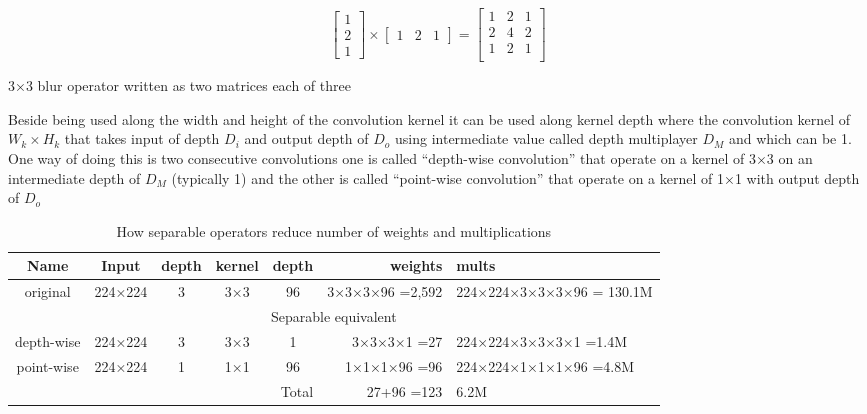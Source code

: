 \begin{eqfloat}
\begin{equation}
\begin{bmatrix}
1 \\
2 \\
1
\end{bmatrix}
\times
\begin{bmatrix}
1 & 2 & 1
\end{bmatrix}
=\begin{bmatrix}
1 & 2 & 1 \\
2 & 4 & 2 \\
1 & 2 & 1 \\
\end{bmatrix}
\label{eq:sep_blur}
\end{equation}
\caption{ 3×3 blur operator written as two matrices each of three }
\end{eqfloat}

Beside being used along the width and height of the convolution kernel it can be used along kernel depth
where the convolution kernel of \( W_k \times H_k \) that takes input of depth \(D_i\)
and output depth of \(D_o\) using intermediate value called depth multiplayer \(D_M\) and which can be 1.
One way of doing this is two consecutive convolutions one is called\autocite{chollet2016xception}\autocite{mamalet2012simplifying}
``depth-wise convolution'' that operate on a kernel of 3×3 on an intermediate depth of \(D_M\) (typically 1)
and the other is called ``point-wise convolution'' that operate on a kernel of 1×1 with output depth of \(D_o\)

\newcommand{\ra}[1]{\renewcommand{\arraystretch}{#1}}

\begin{table*}\caption{How separable operators reduce number of weights and multiplications}\label{table:sep_op}
\centering
\begin{small}
\begin{tabularx}{\textwidth}{cccccrX}
\toprule
Name & Input & depth & kernel & depth & weights & mults \\
\midrule
original & 224×224 & 3 & 3×3 & 96 & 3×3×3×96 =2,592 & 224×224×3×3×3×96 = 130.1M \\
\bottomrule
\multicolumn{7}{c}{Separable equivalent} \\
\midrule
depth-wise & 224×224 & 3 & 3×3 & 1 & 3×3×3×1 =27 & 224×224×3×3×3×1 =1.4M \\
\midrule
point-wise & 224×224 & 1 & 1×1 & 96 & 1×1×1×96 =96 & 224×224×1×1×1×96 =4.8M \\
\cmidrule{5-7}
\multicolumn{5}{r}{Total} & 27+96 =123 & 6.2M \\
\bottomrule
\end{tabularx}
\end{small}
\end{table*}

